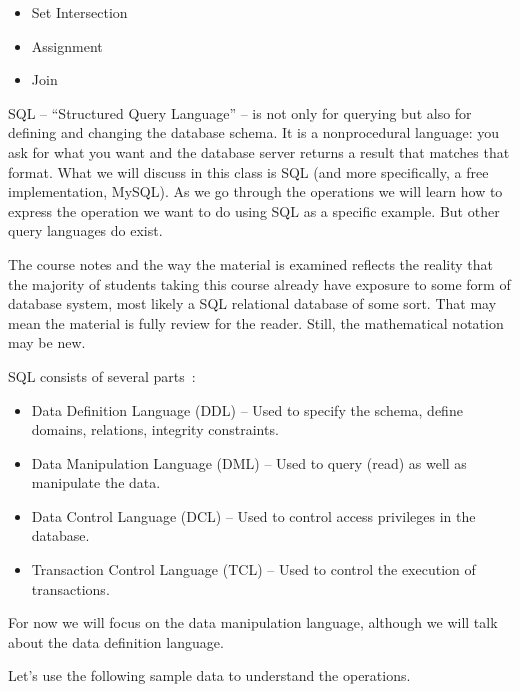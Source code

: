 \begin{itemize}
	\item Set Intersection
	\item Assignment
	\item Join
\end{itemize}

SQL -- ``Structured Query Language'' -- is not only for querying but also for defining and changing the database schema. It is a nonprocedural language: you ask for what you want and the database server returns a result that matches that format. What we will discuss in this class is SQL (and more specifically, a free implementation, MySQL). As we go through the operations we will learn how to express the operation we want to do using SQL as a specific example. But other query languages do exist.

The course notes and the way the material is examined reflects the reality that the majority of students taking this course already have exposure to some form of database system, most likely a SQL relational database of some sort. That may mean the material is fully review for the reader. Still, the mathematical notation may be new.

SQL consists of several parts~\cite{dsc}:
\begin{itemize}
	\item Data Definition Language (DDL) -- Used to specify the schema, define domains, relations, integrity constraints.
	\item Data Manipulation Language (DML) -- Used to query (read) as well as manipulate the data.
	\item Data Control Language (DCL) -- Used to control access privileges in the database. 
	\item Transaction Control Language (TCL) -- Used to control the execution of transactions.
\end{itemize}

For now we will focus on the data manipulation language, although we will talk about the data definition language.

Let's use the following sample data to understand the operations.



